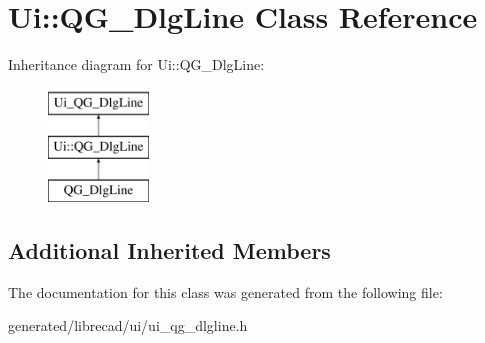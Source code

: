 \hypertarget{classUi_1_1QG__DlgLine}{\section{Ui\-:\-:Q\-G\-\_\-\-Dlg\-Line Class Reference}
\label{classUi_1_1QG__DlgLine}
}
Inheritance diagram for Ui\-:\-:Q\-G\-\_\-\-Dlg\-Line\-:\begin{figure}[H]
\begin{center}
\leavevmode
\includegraphics[height=3.000000cm]{classUi_1_1QG__DlgLine}
\end{center}
\end{figure}
\subsection*{Additional Inherited Members}


The documentation for this class was generated from the following file\-:\begin{DoxyCompactItemize}
\item 
generated/librecad/ui/ui\-\_\-qg\-\_\-dlgline.\-h\end{DoxyCompactItemize}

